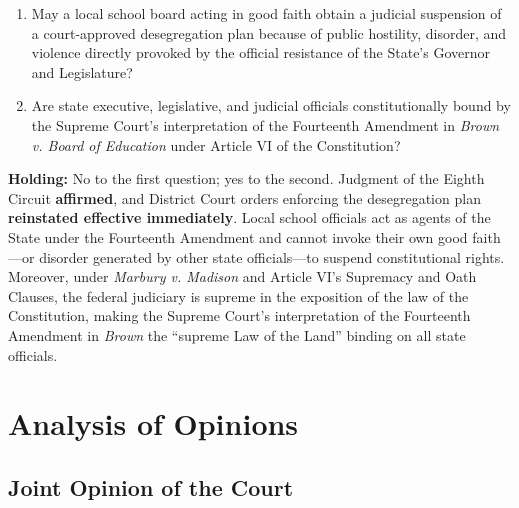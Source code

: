 \documentclass[12pt]{article}
\begin{document}
\begin{enumerate}
  \item May a local school board acting in good faith obtain a judicial suspension of a court-approved desegregation plan because of public hostility, disorder, and violence directly provoked by the official resistance of the State's Governor and Legislature?
  \item Are state executive, legislative, and judicial officials constitutionally bound by the Supreme Court's interpretation of the Fourteenth Amendment in \textit{Brown v. Board of Education} under Article VI of the Constitution?
\end{enumerate}

\textbf{Holding:} No to the first question; yes to the second. Judgment of the Eighth Circuit \textbf{affirmed}, and District Court orders enforcing the desegregation plan \textbf{reinstated effective immediately}. Local school officials act as agents of the State under the Fourteenth Amendment and cannot invoke their own good faith---or disorder generated by other state officials---to suspend constitutional rights. Moreover, under \textit{Marbury v. Madison} and Article VI's Supremacy and Oath Clauses, the federal judiciary is supreme in the exposition of the law of the Constitution, making the Supreme Court's interpretation of the Fourteenth Amendment in \textit{Brown} the ``supreme Law of the Land'' binding on all state officials.

\section{Analysis of Opinions}
\subsection{Joint Opinion of the Court}
\end{document}
